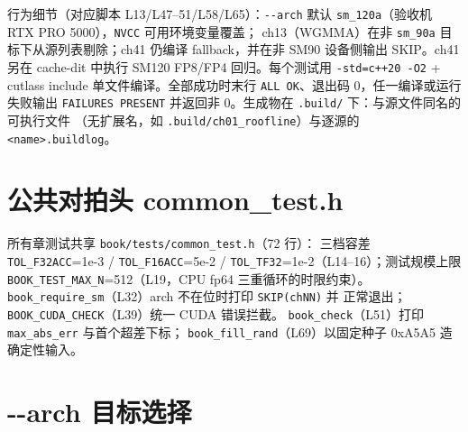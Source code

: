行为细节（对应脚本 L13/L47--51/L58/L65）：\texttt{-{}-arch} 默认
\texttt{sm\_120a}（验收机 RTX PRO 5000），\texttt{NVCC} 可用环境变量覆盖；
ch13（WGMMA）在非 \texttt{sm\_90a} 目标下从源列表剔除；ch41 仍编译
fallback，并在非 SM90 设备侧输出 SKIP。ch41 另在 cache-dit 中执行
SM120 FP8/FP4 回归。每个测试用
\texttt{-std=c++20 -O2} + cutlass include 单文件编译。全部成功时末行
\texttt{ALL~OK}、退出码 0，任一编译或运行失败输出 \texttt{FAILURES~PRESENT}
并返回非 0。生成物在 \texttt{.build/} 下：与源文件同名的可执行文件
（无扩展名，如 \texttt{.\allowbreak{}build/\allowbreak{}ch01\_\allowbreak{}roofline}）与逐源的
\texttt{\allowbreak{}<name>.\allowbreak{}buildlog}。

\section{公共对拍头 common\_test.h}

所有章测试共享 \texttt{book/\allowbreak{}tests/\allowbreak{}common\_\allowbreak{}test.\allowbreak{}h}（72 行）：
三档容差 \texttt{TOL\_F32ACC}=1e-3 / \texttt{TOL\_F16ACC}=5e-2 /
\texttt{TOL\_TF32}=1e-2（L14--16）；测试规模上限
\texttt{BOOK\_\allowbreak{}TEST\_\allowbreak{}MAX\_\allowbreak{}N}=512（L19，CPU fp64 三重循环的时限约束）。
\texttt{book\_\allowbreak{}require\_\allowbreak{}sm}（L32）arch 不在位时打印 \texttt{SKIP(chNN)} 并
正常退出；\texttt{BOOK\_\allowbreak{}CUDA\_\allowbreak{}CHECK}（L39）统一 CUDA 错误拦截。
\texttt{book\_check}（L51）打印 \texttt{max\_abs\_err} 与首个超差下标；
\texttt{book\_\allowbreak{}fill\_\allowbreak{}rand}（L69）以固定种子 0xA5A5 造确定性输入。

\section{-{}-arch 目标选择}

